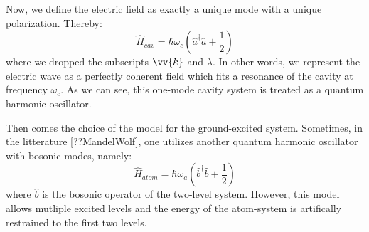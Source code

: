 \documentclass[11pt]{report}
\begin{document}
Now, we define the electric field as exactly a unique mode with a unique polarization. Thereby:
\begin{equation}
\hat{H}_{cav} = \hbar \omega_c \left( \hat{a}^\dag \hat{a} + \frac{1}{2} \right)
\end{equation}
where we dropped the subscripts $\vv{k}$ and $\lambda$. In other words, we represent the electric wave as a perfectly coherent field which fits a resonance of the cavity at frequency $\omega_c$. As we can see, this one-mode cavity system is treated as a quantum harmonic oscillator.

Then comes the choice of the model for the ground-excited system. Sometimes, in the litterature [??MandelWolf], one utilizes another quantum harmonic oscillator with bosonic modes, namely:
\begin{equation}
\label{sec_bosonic_mw}
\hat{H}_{atom} = \hbar \omega_a \left( \hat{b}^\dag \hat{b} + \frac{1}{2} \right)
\end{equation}
where $\hat{b}$ is the bosonic operator of the two-level system. However, this model allows mutliple excited levels and the energy of the atom-system is artifically restrained to the first two levels.
\end{document}
